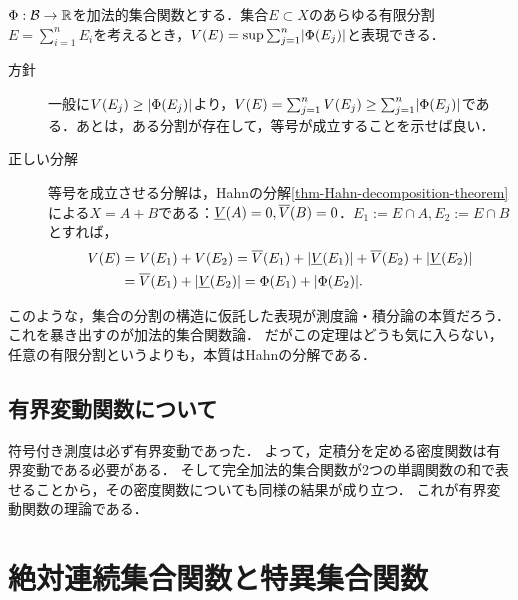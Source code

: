 \documentclass[uplatex, dvipdfmx]{jsreport}
\begin{document}
\begin{corollary}[全変動の特徴付け]
    $\Phi:\mathcal{B}\to\mathbb{R}$を加法的集合関数とする．集合$E\subset X$のあらゆる有限分割$E=\sum^n_{i=1}E_i$を考えるとき，$V(E)=\sup\sum^n_{j=1}\lvert\Phi(E_j)\rvert$と表現できる．
\end{corollary}
\begin{Proof}\mbox{}
    \begin{description}
        \item[方針] 一般に$V(E_j)\ge\lvert\Phi(E_j)\rvert$より，$V(E)=\sum^n_{j=1}V(E_j)\ge\sum^n_{j=1}\lvert\Phi(E_j)\rvert$である．あとは，ある分割が存在して，等号が成立することを示せば良い．
        \item[正しい分解] 等号を成立させる分解は，Hahnの分解\ref{thm-Hahn-decomposition-theorem}による$X=A+B$である：$\underline{V}(A)=0,\overline{V}(B)=0$．$E_1:=E\cap A,E_2:=E\cap B$とすれば， \begin{align*}
            V(E)&=V(E_1)+V(E_2)=\overline{V}(E_1)+\lvert\underline{V}(E_1)\rvert+\overline{V}(E_2)+\lvert\underline{V}(E_2)\rvert\\
            &=\overline{V}(E_1)+\lvert\underline{V}(E_2)\rvert=\Phi(E_1)+\lvert\Phi(E_2)\rvert.
        \end{align*}
    \end{description}
\end{Proof}
\begin{remarks}
    このような，集合の分割の構造に仮託した表現が測度論・積分論の本質だろう．
    これを暴き出すのが加法的集合関数論．
    だがこの定理はどうも気に入らない，任意の有限分割というよりも，本質はHahnの分解である．
\end{remarks}

\subsection{有界変動関数について}

\begin{tcolorbox}[colframe=ForestGreen, colback=ForestGreen!10!white,breakable,colbacktitle=ForestGreen!40!white,coltitle=black,fonttitle=\bfseries\sffamily,
title=]
    符号付き測度は必ず有界変動であった．
    よって，定積分を定める密度関数は有界変動である必要がある．
    そして完全加法的集合関数が2つの単調関数の和で表せることから，その密度関数についても同様の結果が成り立つ．
    これが有界変動関数の理論である．
\end{tcolorbox}

\section{絶対連続集合関数と特異集合関数}
\end{document}
